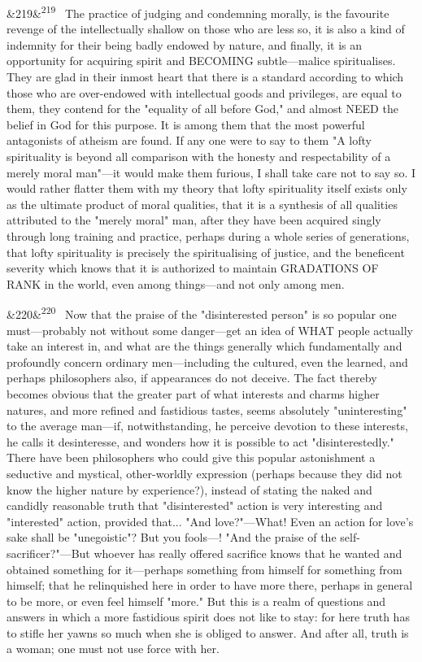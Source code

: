 \documentclass[12pt]{article}
\newcommand{\para}[1][]{\par\noindent\ifx&#1&\else\textsuperscript{\footnotesize #1}~\fi}
\begin{document}
\para[219] The practice of judging and condemning morally, is the favourite revenge of the intellectually shallow on those who are less so, it is also a kind of indemnity for their being badly endowed by nature, and finally, it is an opportunity for acquiring spirit and BECOMING subtle---malice spiritualises. They are glad in their inmost heart that there is a standard according to which those who are over-endowed with intellectual goods and privileges, are equal to them, they contend for the "equality of all before God," and almost NEED the belief in God for this purpose. It is among them that the most powerful antagonists of atheism are found. If any one were to say to them "A lofty spirituality is beyond all comparison with the honesty and respectability of a merely moral man"---it would make them furious, I shall take care not to say so. I would rather flatter them with my theory that lofty spirituality itself exists only as the ultimate product of moral qualities, that it is a synthesis of all qualities attributed to the "merely moral" man, after they have been acquired singly through long training and practice, perhaps during a whole series of generations, that lofty spirituality is precisely the spiritualising of justice, and the beneficent severity which knows that it is authorized to maintain GRADATIONS OF RANK in the world, even among things---and not only among men.

\para[220] Now that the praise of the "disinterested person" is so popular one must---probably not without some danger---get an idea of WHAT people actually take an interest in, and what are the things generally which fundamentally and profoundly concern ordinary men---including the cultured, even the learned, and perhaps philosophers also, if appearances do not deceive. The fact thereby becomes obvious that the greater part of what interests and charms higher natures, and more refined and fastidious tastes, seems absolutely "uninteresting" to the average man---if, notwithstanding, he perceive devotion to these interests, he calls it desinteresse, and wonders how it is possible to act "disinterestedly." There have been philosophers who could give this popular astonishment a seductive and mystical, other-worldly expression (perhaps because they did not know the higher nature by experience?), instead of stating the naked and candidly reasonable truth that "disinterested" action is very interesting and "interested" action, provided that... "And love?"---What! Even an action for love's sake shall be "unegoistic"? But you fools---! "And the praise of the self-sacrificer?"---But whoever has really offered sacrifice knows that he wanted and obtained something for it---perhaps something from himself for something from himself; that he relinquished here in order to have more there, perhaps in general to be more, or even feel himself "more." But this is a realm of questions and answers in which a more fastidious spirit does not like to stay: for here truth has to stifle her yawns so much when she is obliged to answer. And after all, truth is a woman; one must not use force with her.
\end{document}
